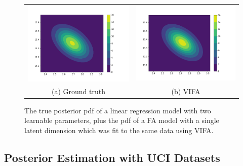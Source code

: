 \documentclass[msc,deptreport.inf]{infthesis} %
\begin{document}
\begin{figure}[!htbp] 
	\begin{tabular}{cc}
		 \includegraphics[width=70mm]{plots/linear_model_true_posterior__alpha=0.01__beta=0.1.png}
		 & \includegraphics[width=70mm]{plots/linear_model_vi_posterior__alpha=0.01__beta=0.1__latent_dim=1.png} \\
		 (a) Ground truth
		 & (b) VIFA \\[6pt]
	\end{tabular}
	\caption{The true posterior pdf of a linear regression model with two learnable parameters, plus the pdf of a FA model with a single latent dimension which was fit to the same data using VIFA.}
	\label{fig:linear_regression_vi_posterior}
\end{figure}


\subsection{Posterior Estimation with UCI Datasets}\label{sec:vifa_posterior_uci}
\end{document}
